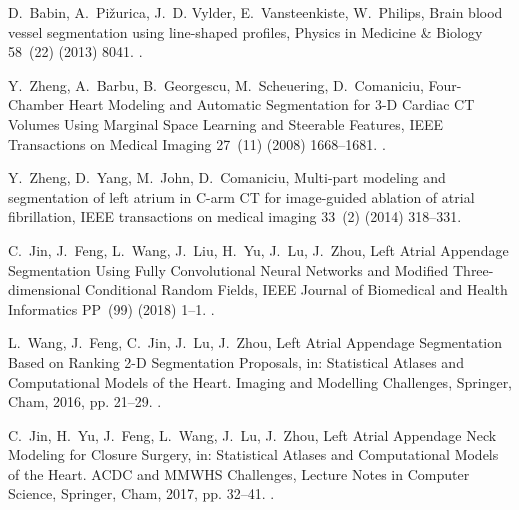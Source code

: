 \documentclass[review]{elsarticle}
\begin{document}
\begin{thebibliography}{10}
D.~Babin, A.~Pi{\v z}urica, J.~D. Vylder, E.~Vansteenkiste, W.~Philips, Brain
  blood vessel segmentation using line-shaped profiles, Physics in Medicine \&
  Biology 58~(22) (2013) 8041.
\newblock \href {http://dx.doi.org/10.1088/0031-9155/58/22/8041}
  {}.

Y.~Zheng, A.~Barbu, B.~Georgescu, M.~Scheuering, D.~Comaniciu, Four-{{Chamber
  Heart Modeling}} and {{Automatic Segmentation}} for 3-{{D Cardiac CT Volumes
  Using Marginal Space Learning}} and {{Steerable Features}}, IEEE Transactions
  on Medical Imaging 27~(11) (2008) 1668--1681.
\newblock \href {http://dx.doi.org/10.1109/TMI.2008.2004421}
  {}.

Y.~Zheng, D.~Yang, M.~John, D.~Comaniciu, Multi-part modeling and segmentation
  of left atrium in {{C}}-arm {{CT}} for image-guided ablation of atrial
  fibrillation, IEEE transactions on medical imaging 33~(2) (2014) 318--331.

C.~Jin, J.~Feng, L.~Wang, J.~Liu, H.~Yu, J.~Lu, J.~Zhou, Left {{Atrial
  Appendage Segmentation Using Fully Convolutional Neural Networks}} and
  {{Modified Three}}-dimensional {{Conditional Random Fields}}, IEEE Journal of
  Biomedical and Health Informatics PP~(99) (2018) 1--1.
\newblock \href {http://dx.doi.org/10.1109/JBHI.2018.2794552}
  {}.

L.~Wang, J.~Feng, C.~Jin, J.~Lu, J.~Zhou, Left {{Atrial Appendage Segmentation
  Based}} on {{Ranking}} 2-{{D Segmentation Proposals}}, in: Statistical
  {{Atlases}} and {{Computational Models}} of the {{Heart}}. {{Imaging}} and
  {{Modelling Challenges}}, {Springer, Cham}, 2016, pp. 21--29.
\newblock \href {http://dx.doi.org/10.1007/978-3-319-52718-5_3}
  {}.

C.~Jin, H.~Yu, J.~Feng, L.~Wang, J.~Lu, J.~Zhou, Left {{Atrial Appendage Neck
  Modeling}} for {{Closure Surgery}}, in: Statistical {{Atlases}} and
  {{Computational Models}} of the {{Heart}}. {{ACDC}} and {{MMWHS Challenges}},
  Lecture Notes in Computer Science, {Springer, Cham}, 2017, pp. 32--41.
\newblock \href {http://dx.doi.org/10.1007/978-3-319-75541-0_4}
  {}.


\end{thebibliography}
\end{document}
